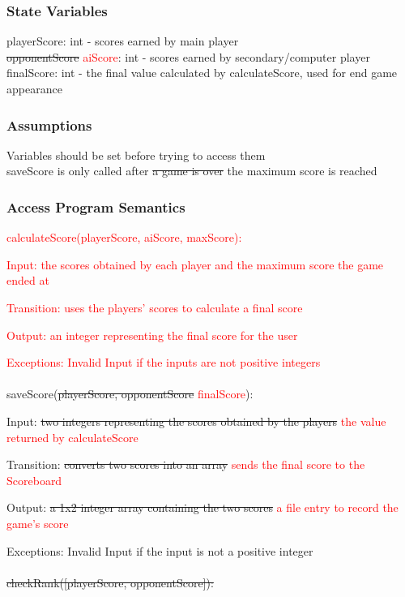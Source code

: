 \documentclass[12pt, titlepage]{article}
\begin{document}
		\subsubsection{State Variables}
		playerScore: int - scores earned by main player \\
		\sout{opponentScore} \textcolor{red}{aiScore}: int - scores earned by secondary/computer player \\
		finalScore: int - the final value calculated by calculateScore, used for end game appearance
		
		\subsubsection{Assumptions}
		Variables should be set before trying to access them \\
		saveScore is only called after \sout{a game is over} the maximum score is reached
		
		\subsubsection{Access Program Semantics}
		\textcolor{red}{calculateScore(playerScore, aiScore, maxScore):}
		
		\textcolor{red}{Input: the scores obtained by each player and the maximum score the game ended at}
		
		\textcolor{red}{Transition: uses the players' scores to calculate a final score}
		
		\textcolor{red}{Output: an integer representing the final score for the user}
		
		\textcolor{red}{Exceptions: Invalid Input if the inputs are not positive integers} \\
		\\
		saveScore(\sout{playerScore, opponentScore} \textcolor{red}{finalScore}):
		
		Input: \sout{two integers representing the scores obtained by the players} \textcolor{red}{the value returned by calculateScore}
		
		Transition: \sout{converts two scores into an array} \textcolor{red}{sends the final score to the Scoreboard}
		
		Output: \sout{a 1x2 integer array containing the two scores} \textcolor{red}{a file entry to record the game's score}
		
		Exceptions: Invalid Input if the input is not a positive integer \\
		\\
		\sout{checkRank([playerScore, opponentScore]):}
		
\end{document}
